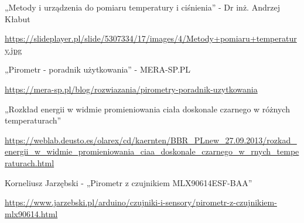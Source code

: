 \cleardoublepage
{}
{}
\begin{thebibliography}{999}
\begin{spacing}{1}


    





    

     „Metody i urządzenia do pomiaru temperatury i ciśnienia” - Dr inż. Andrzej Kłabut

    \url{https://slideplayer.pl/slide/5307334/17/images/4/Metody+pomiaru+temperatury.jpg}

     „Pirometr - poradnik użytkowania” - MERA-SP.PL

    \url{https://mera-sp.pl/blog/rozwiazania/pirometry-poradnik-uzytkowania}

     „Rozkład energii w widmie promieniowania ciała doskonale czarnego w różnych temperaturach”

    \url{https://weblab.deusto.es/olarex/cd/kaernten/BBR_PLnew_27.09.2013/rozkad_energii_w_widmie_promieniowania_ciaa_doskonale_czarnego_w_rnych_temperaturach.html}

     Korneliusz Jarzębski - „Pirometr z czujnikiem MLX90614ESF-BAA”

    \url{https://www.jarzebski.pl/arduino/czujniki-i-sensory/pirometr-z-czujnikiem-mlx90614.html}

\end{spacing}
\end{thebibliography}